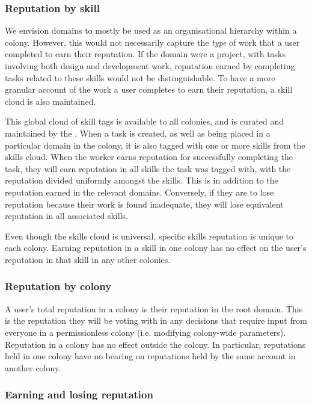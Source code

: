 \subsubsection*{Reputation by skill}\label{sec:rep-by-skill}

We envision domains to mostly be used as an organisational hierarchy within a colony. However, this would not necessarily capture the \emph{type} of work that a user completed to earn their reputation. If the domain were a project, with tasks involving both design and development work, reputation earned by completing tasks related to these skills would not be distinguishable. To have a more granular account of the work a user completes to earn their reputation, a skill cloud is also maintained.

This global cloud of skill tags is available to all colonies, and is curated and maintained by the \rc. When a task is created, as well as being placed in a particular domain in the colony, it is also tagged with one or more skills from the skills cloud. When the worker earns reputation for successfully completing the task, they will earn reputation in all skills the task was tagged with, with the reputation divided uniformly amongst the skills. This is in addition to the reputation earned in the relevant domains. Conversely, if they are to lose reputation because their work is found inadequate, they will lose equivalent reputation in all associated skills.

Even though the skills cloud is universal, specific skills reputation is unique to each colony. Earning reputation in a skill in one colony has no effect on the user's reputation in that skill in any other colonies.

\subsubsection*{Reputation by colony}\label{sec:rep-by-colony}

A user's total reputation in a colony is their reputation in the root domain. This is the reputation they will be voting with in any decisions that require input from everyone in a permissionless colony (i.e. modifying colony-wide parameters). Reputation in a colony has no effect outside the colony. In particular, reputations held in one colony have no bearing on reputations held by the same account in another colony.

\subsubsection{Earning and losing reputation}\label{sec:earning-losing-rep}

